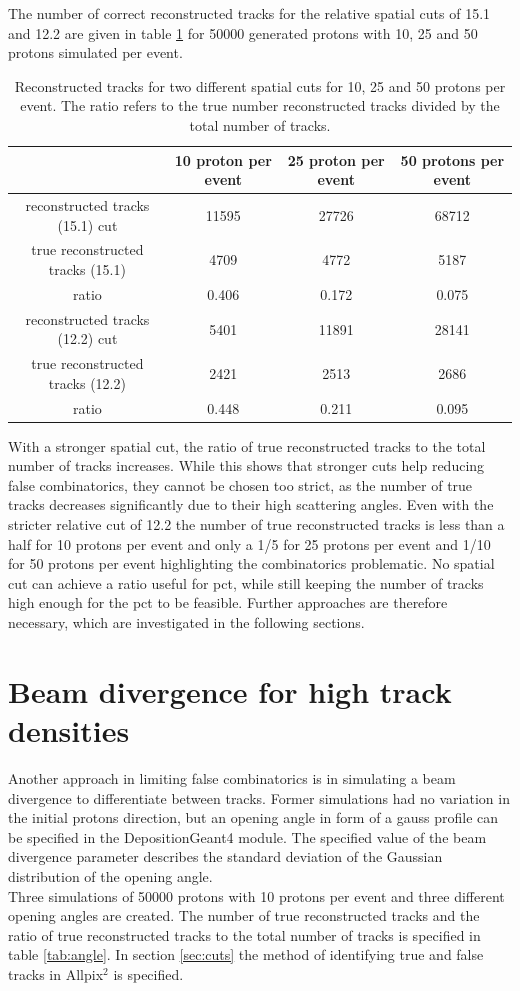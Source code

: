 The number of correct reconstructed tracks for the relative spatial cuts of 15.1 and 12.2 are given in table
\ref{tab:true_tracks} for 50000 generated protons with 10,
25 and 50 protons simulated per event.


\begin{table}
  \hspace{-1.5cm}
  \begin{tabular}{c | c c c}
    \toprule
     & 10 proton per event & 25 proton per event & 50 protons per event\\
    \midrule
    reconstructed tracks (15.1) cut & 11595 & 27726 & 68712  \\
    true reconstructed tracks (15.1) & 4709 & 4772  & 5187 \\
    ratio & 0.406 & 0.172 & 0.075 \\
    \midrule
    reconstructed tracks (12.2) cut & 5401 & 11891 & 28141 \\
    true reconstructed tracks (12.2) &  2421 &2513  & 2686 \\
    ratio & 0.448 & 0.211 & 0.095
  \end{tabular}
  \caption{Reconstructed tracks for two different spatial cuts for 10, 25 and 50 protons per event. The ratio refers to the true
  number reconstructed tracks divided by the total number of tracks.}
  \label{tab:true_tracks}
\end{table}

With a stronger spatial cut,  the ratio of true reconstructed tracks to
the total number of tracks increases. While this shows that stronger cuts help reducing false combinatorics, they cannot be chosen too strict,
as the number of true tracks decreases significantly due to their high scattering angles. Even with the stricter relative cut of 12.2 the
number of true reconstructed tracks is  less than a half for 10 protons per event and only a 1/5 for 25 protons per event and 1/10 for 50 protons per event highlighting
the combinatorics problematic. No spatial cut can achieve a ratio useful for pct, while still keeping the number
of tracks high enough for the pct to be feasible. Further approaches are therefore necessary, which are investigated in the following sections.

\section{Beam divergence for high track densities}
Another approach in limiting false combinatorics is in simulating a beam divergence to differentiate between tracks. Former simulations had no variation
in the initial protons direction, but an opening angle in form of a gauss profile can be specified in the DepositionGeant4 module. The specified value of
the beam divergence parameter describes the standard deviation of the Gaussian distribution of the opening angle.  \\
Three simulations of 50000 protons with 10 protons per event and three different opening angles are created.
The number of true reconstructed tracks and the ratio
of true reconstructed tracks to the total number of tracks is specified in table \ref{tab:angle}. In section \ref{sec:cuts} the method of identifying
true and false tracks in Allpix$^2$ is specified.

